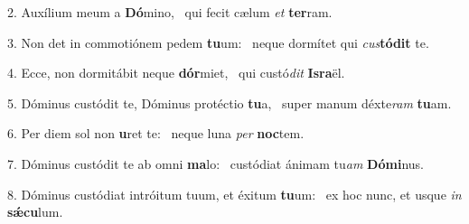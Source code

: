 2. Auxílium meum a \textbf{Dó}mino, \ast\  qui fecit cælum \textit{et} \textbf{ter}ram.\

3. Non det in commotiónem pedem \textbf{tu}um: \ast\  neque dormítet qui \textit{cus}\textbf{tó}\textbf{dit} te.\

4. Ecce, non dormitábit neque \textbf{dór}miet, \ast\  qui custó\textit{dit} \textbf{Is}\textbf{ra}ël.\

5. Dóminus custódit te, Dóminus protéctio \textbf{tu}a, \ast\  super manum déxte\textit{ram} \textbf{tu}am.\

6. Per diem sol non \textbf{u}ret te: \ast\  neque luna \textit{per} \textbf{noc}tem.\

7. Dóminus custódit te ab omni \textbf{ma}lo: \ast\  custódiat ánimam tu\textit{am} \textbf{Dó}\textbf{mi}nus.\

8. Dóminus custódiat intróitum tuum, et éxitum \textbf{tu}um: \ast\  ex hoc nunc, et usque \textit{in} \textbf{sǽ}\textbf{cu}lum.\

